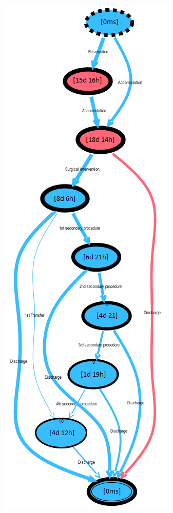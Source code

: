 \begin{figure} [htbp]
\begin{minipage}[t]{0.3\textwidth}
\includegraphics[width=\textwidth]{RicoveriTransitionSystemSojournYoungs}

\end{minipage}
\end{figure}
